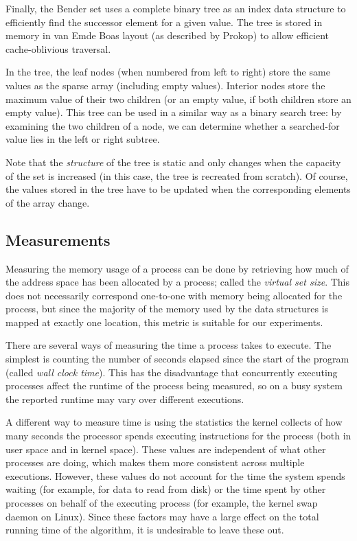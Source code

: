 \documentclass{acm_proc_article-sp}
\begin{document}
Finally, the Bender set uses a complete binary tree as an index data structure
to efficiently find the successor element for a given value. The tree is
stored in memory in van Emde Boas layout (as described by Prokop) to allow
efficient cache-oblivious traversal.

In the tree, the leaf nodes (when numbered from left to right) store the same values
as the sparse array (including empty values).
Interior nodes store the maximum value of their two children (or an empty value,
if both children store an empty value).
This tree can be used in a similar way as a binary search tree: by examining the
two children of a node, we can determine whether a searched-for value lies in the
left or right subtree.

Note that the \emph{structure} of the tree is static and only changes when the
capacity of the set is increased (in this case, the tree is recreated from scratch).
Of course, the values stored in the tree have to be updated when the corresponding
elements of the array change.

\subsection{Measurements}
Measuring the memory usage of a process can be done by retrieving how much of the
address space has been allocated by a process; called the \emph{virtual set
size}. This does not necessarily correspond one-to-one with memory being allocated
for the process, but since the majority of the memory used by the
data structures is mapped at exactly one location, this metric is suitable
for our experiments.

There are several ways of measuring the time a process takes to execute.
The simplest is counting the number of seconds elapsed since the start of the
program (called \emph{wall clock time}).
This has the disadvantage that concurrently executing processes affect the runtime
of the process being measured, so on a busy system the reported runtime may vary
over different executions.

A different way to measure time is using the statistics the kernel collects
of how many seconds the processor spends executing instructions for the process
(both in user space and in kernel space). These values are independent of
what other processes are doing, which makes them more consistent across
multiple executions. However, these values do not account for the time the
system spends waiting (for example, for data to read from disk)
or the time spent by other processes on behalf of the executing process
(for example, the kernel swap daemon on Linux). Since these factors may have
a large effect on the total running time of the algorithm, it is undesirable
to leave these out.
\end{document}

